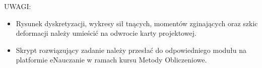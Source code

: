 \documentclass[a4paper,10pt]{article}
\begin{document}
    \vspace{5mm}
    UWAGI:
    \begin{itemize}
        \item Rysunek dyskretyzacji, wykresy sił tnących, momentów zginających oraz szkic deformacji należy umieścić na odwrocie karty projektowej.
        \item Skrypt rozwiązujący zadanie należy przesłać do odpowiedniego modułu na platformie eNauczanie w ramach kursu Metody Obliczeniowe.
    \end{itemize}
\end{document}
